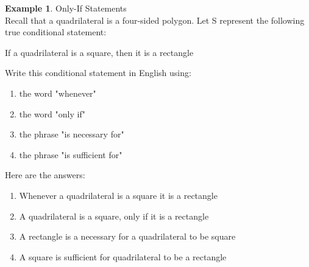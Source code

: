 \documentclass{book}
\theoremstyle{definition}
\newtheorem{example}{Example}[definition]
\theoremstyle{remark}
\begin{document}
\begin{example}
Only-If Statements \cite[Chap.2, P.C.2.1]{ted} \\

Recall that a quadrilateral  is a four-sided polygon. Let S represent the following true conditional statement:
\begin{center}
    If a quadrilateral is a square, then it is a rectangle
\end{center} 

Write this conditional statement in English using: \\
\begin{enumerate}
    \item the word "whenever"
    \item the word "only if"
    \item the phrase "is necessary for"
    \item the phrase "is sufficient for"
\end{enumerate}

Here are the answers: \\

\begin{enumerate}
    \item Whenever a quadrilateral is a square it is a rectangle 
    \item A quadrilateral is a square, only if it is a rectangle 
    \item A rectangle is a necessary for a quadrilateral to be square 
    \item A square is sufficient for quadrilateral to be a rectangle 
\end{enumerate}

\end{example}
\end{document}
